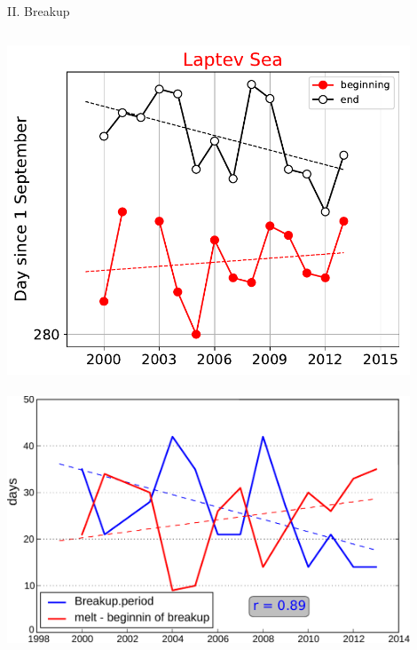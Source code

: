 \documentclass[8pt]{beamer}
\begin{document}
\setwatermark{\fontsize{125pt}{125pt}\selectfont{}}
\begin{frame}[fragile]{II. Breakup}
	\begin{columns}
		\includegraphics[width=0.9\textwidth]{./img/Brkp_LS.pdf}\\~\\
		\includegraphics[width=0.9\textwidth]{./img/Breakup.pdf}\\~\\
	\end{columns}
	

\end{frame}
\end{document}

